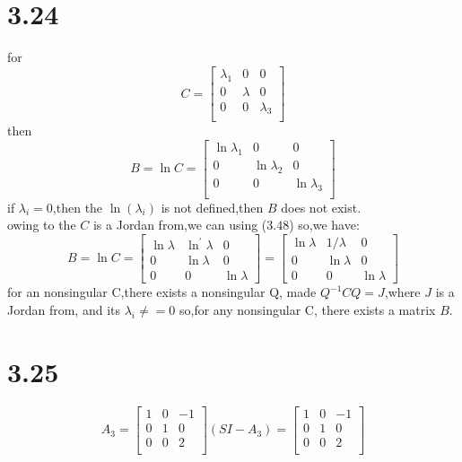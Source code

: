 \documentclass{article}
\begin{document}
\section*{3.24}
for
\[C=
\left[
\begin{array}{ccc}
\lambda_1 & 0 & 0\\
0 & \lambda & 0\\
0 & 0 & \lambda_3\\
\end{array}
\right]
\]
then
\[B=\ln{C}=
\left[
\begin{array}{ccc}
\ln{\lambda_1} & 0 & 0\\
0 & \ln{\lambda_2} & 0\\
0 & 0 & \ln{\lambda_3}\\
\end{array}
\right]
\]
if $\lambda_i=0$,then the $\ln(\lambda_i)$ is not defined,then $B$ does not exist.\\
owing to the $C$ is a Jordan from,we can using (3.48)
so,we have:
\[
B=\ln C=\left[\begin{array}{ccc}
\ln \lambda & \ln ^{\prime} \lambda & 0 \\
0 & \ln \lambda & 0 \\
0 & 0 & \ln \lambda
\end{array}\right]=\left[\begin{array}{ccc}
\ln \lambda & 1 / \lambda & 0 \\
0 & \ln \lambda & 0 \\
0 & 0 & \ln \lambda
\end{array}\right]   
\]
for an nonsingular C,there exists a nonsingular Q,
made $Q^{-1}CQ=J$,where $J$ is a Jordan from, and its $\lambda_i \neq=0$ 
so,for any nonsingular C, there exists a matrix $B$.

\section*{3.25}
\[A_3=
\left[
\begin{array}{ccc}
1 & 0 & -1\\
0 & 1 & 0\\
0 & 0 & 2\\
\end{array}
\right]
(SI-A_3)=
\left[
\begin{array}{ccc}
    1 & 0 & -1\\
    0 & 1 & 0\\
    0 & 0 & 2\\
    \end{array}
    \right]
\]
\end{document}
